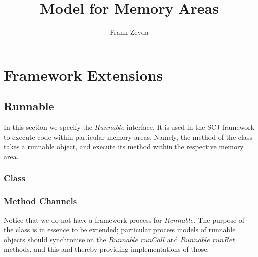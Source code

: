 \documentclass{article}
\title{{\Circus} Model for Memory Areas}
\author{Frank Zeyda}
\begin{document}
\maketitle

\tableofcontents

\newpage


\section{Framework Extensions}

\subsection{Runnable}

In this section we specify the $Runnable$ interface. It is used in the SCJ framework to execute code within particular memory areas. Namely, the  method of the  class takes a runnable object, and execute its  method within the respective memory area.

\subsubsection{{\OhCircus} Class}
\vspace{-0.5em}

\begin{circusbox}

\end{circusbox}
\vspace{0.5em}

\nid {}

\subsubsection{Method Channels}
\vspace{-0.5em}

\begin{circusbox}

\end{circusbox}
\vspace{0.5em}

\nid Notice that we do not have a framework process for $Runnable$. The purpose of the {\OhCircus} class is in essence to be extended; particular process models of runnable objects should synchronise on the $Runnable\_runCall$ and $Runnable\_runRet$ methods, and this and thereby providing implementations of those.
\end{document}

